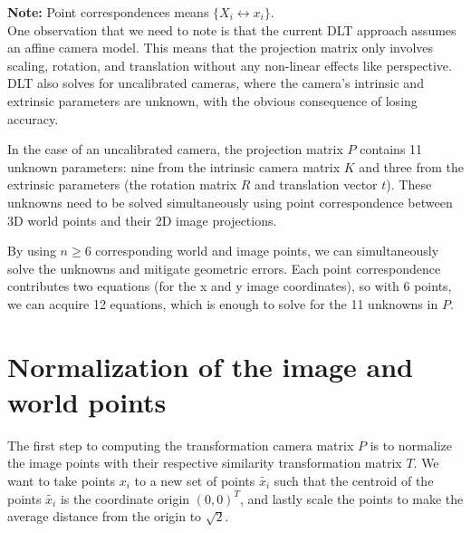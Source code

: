 \documentclass[12pt]{article}
\begin{document}
\noindent \textbf{Note:} Point correspondences means \( \{ X_i \leftrightarrow x_i \} \).\\

One observation that we need to note is that the current DLT approach assumes an affine camera model. This means that the projection matrix only involves scaling, rotation, and translation without any non-linear effects like perspective. DLT also solves for uncalibrated cameras, where the camera's intrinsic and extrinsic parameters are unknown, with the obvious consequence of losing accuracy.

In the case of an uncalibrated camera, the projection matrix \( P \) contains 11 unknown parameters: nine from the intrinsic camera matrix \( K \) and three from the extrinsic parameters (the rotation matrix \( R \) and translation vector \( t \)). These unknowns need to be solved simultaneously using point correspondence between 3D world points and their 2D image projections.

By using \( n \geq 6 \) corresponding world and image points, we can simultaneously solve the unknowns and mitigate geometric errors. Each point correspondence contributes two equations (for the x and y image coordinates), so with 6 points, we can acquire 12 equations, which is enough to solve for the 11 unknowns in \( P \).

\section{Normalization of the image and world points}
The first step to computing the transformation camera matrix \( P \) is to normalize the image points with their respective similarity transformation matrix \( T\). We want to take points \( x_i \) to a new set of points \( \tilde{x_i} \) such that the centroid of the points \( \tilde{x_i} \) is the coordinate origin \( (0, 0)^T \), and lastly scale the points to make the average distance from the origin to \( \sqrt{2} \). \\
\end{document}
